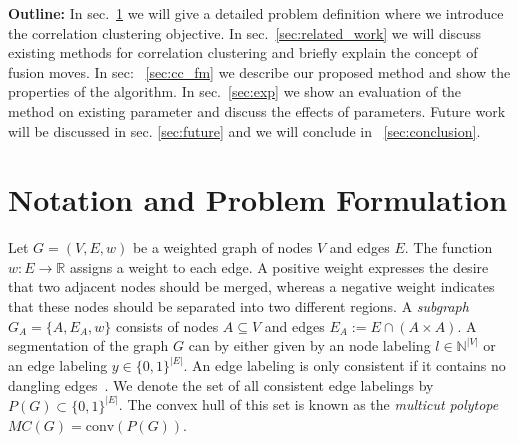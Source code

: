 \documentclass[10pt,twocolumn,letterpaper]{article}
\begin{document}

\textbf{Outline:}
In sec.~\ref{sec:problem_formulation} we will give a 
detailed problem definition where we introduce 
the correlation clustering objective.
In sec.~\ref{sec:related_work} we will 
discuss existing methods for correlation 
clustering and briefly explain the concept of fusion moves.
In sec: ~\ref{sec:cc_fm} we describe our proposed
method and show the properties of the algorithm.
In sec.~\ref{sec:exp} we show an evaluation
of the method on existing parameter  and discuss the effects of parameters.
Future work will be discussed in sec. \ref{sec:future} and
we will conclude in ~\ref{sec:conclusion}.

\section{Notation and Problem Formulation}\label{sec:problem_formulation}
Let $G=(V,E, w)$ be a weighted graph of nodes $V$ and edges $E$.
%
The function $w : E \rightarrow \mathbb{R}$ assigns a weight to each edge.
A positive weight expresses the desire that two adjacent nodes should
be merged, whereas a negative weight indicates
that these nodes should be separated into two different regions.
%
A \emph{subgraph} $G_A = \{A, E_A, w\}$ consists
of nodes $A \subseteq V$ and edges $E_A := E\cap (A\times A)$.
%
A segmentation of the graph $G$ can by either given by an 
node labeling $l \in \mathbb{N}^{|V|}$
or an edge labeling $y \in\{0,1\}^{|E|}$.  
An edge labeling is only consistent if it contains no dangling edges~\cite{kappes_2013_arxiv}.
We denote the set of all consistent edge labelings by $P(G)\subset\{0,1\}^{|E|}$.
The convex hull of this set is known as the \emph{multicut polytope} $MC(G) = \textrm{conv}(P(G))$.
\end{document}
